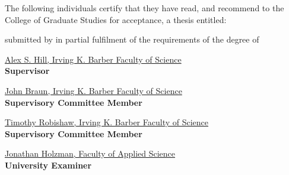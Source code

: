 \frontmatter                    %

\maketitle                      %

\makeatletter
The following individuals certify that they have read, and recommend to the College of Graduate Studies for acceptance, a thesis entitled:

\vspace{2ex}

\textsc{\ul\@title}



\vspace{1ex}

\noindent submitted by \underline{\sc \@author} in partial fulfilment of the requirements of the degree of \underline{\@degreetitle}
\makeatother

\newlength{\linespace}
\setlength{\linespace}{.75cm} %
\vspace{2\linespace}\smaller

\noindent\underline{Alex S. Hill, Irving K. Barber Faculty of Science} 
\\
\textbf{Supervisor}

\vspace{\linespace}

\noindent\underline{John Braun, Irving K. Barber Faculty of Science} 
\\
\textbf{Supervisory Committee Member}

\vspace{\linespace}

\noindent\underline{Timothy Robishaw, Irving K. Barber Faculty of Science} 
\\
\textbf{Supervisory Committee Member}

\vspace{\linespace}

\noindent\underline{Jonathan Holzman, Faculty of Applied Science} 
\\
\textbf{University Examiner}


